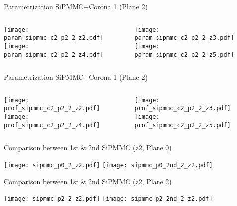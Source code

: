 \documentclass{beamer}
\begin{document}
\begin{frame}{Parametrization SiPMMC+Corona 1 (Plane 2)}
	\begin{columns}[onlytextwidth]
		\begin{column}{0.5\textwidth}
			\texttt{[image: param\_sipmmc\_c2\_p2\_2\_z2.pdf]} \\
			\texttt{[image: param\_sipmmc\_c2\_p2\_2\_z4.pdf]}
		 \end{column}
		 \begin{column}{0.5\textwidth}
			\texttt{[image: param\_sipmmc\_c2\_p2\_2\_z3.pdf]} \\
			\texttt{[image: param\_sipmmc\_c2\_p2\_2\_z5.pdf]}
		 \end{column}
 \end{columns}
\end{frame}

\begin{frame}{Parametrization SiPMMC+Corona 1 (Plane 2)}
	\begin{columns}[onlytextwidth]
		\begin{column}{0.5\textwidth}
			\texttt{[image: prof\_sipmmc\_c2\_p2\_2\_z2.pdf]} \\
			\texttt{[image: prof\_sipmmc\_c2\_p2\_2\_z4.pdf]}
		 \end{column}
		 \begin{column}{0.5\textwidth}
			\texttt{[image: prof\_sipmmc\_c2\_p2\_2\_z3.pdf]} \\
			\texttt{[image: prof\_sipmmc\_c2\_p2\_2\_z5.pdf]}
		 \end{column}
 \end{columns}
\end{frame}

\begin{frame}{Comparison between 1st \& 2nd SiPMMC (z2, Plane 0)}
\begin{adjustwidth}{-1.5em}{-1.5em}
	\texttt{[image: sipmmc\_p0\_2\_z2.pdf]}
	\texttt{[image: sipmmc\_p0\_2nd\_2\_z2.pdf]}
\end{adjustwidth}
\end{frame}

\begin{frame}{Comparison between 1st \& 2nd SiPMMC (z2, Plane 2)}
\begin{adjustwidth}{-1.5em}{-1.5em}
	\texttt{[image: sipmmc\_p2\_2\_z2.pdf]}
	\texttt{[image: sipmmc\_p2\_2nd\_2\_z2.pdf]}
\end{adjustwidth}
\end{frame}
\end{document}
